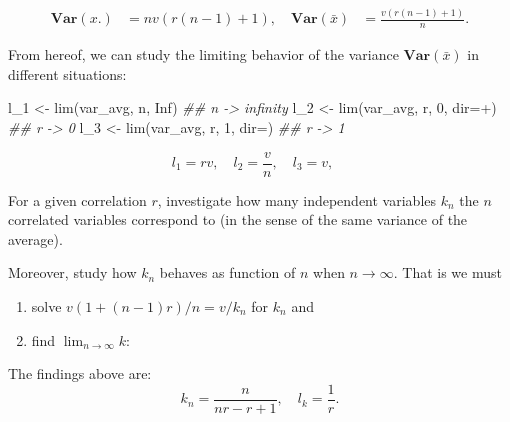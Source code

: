 \documentclass[
  ignorenonframetext,
]{beamer}
\newenvironment{Shaded}{\begin{snugshade}}{\end{snugshade}}
\newcommand{\AttributeTok}[1]{\textcolor[rgb]{0.40,0.45,0.13}{#1}}
\newcommand{\ConstantTok}[1]{\textcolor[rgb]{0.56,0.35,0.01}{#1}}
\newcommand{\DecValTok}[1]{\textcolor[rgb]{0.68,0.00,0.00}{#1}}
\newcommand{\DocumentationTok}[1]{\textcolor[rgb]{0.37,0.37,0.37}{\textit{#1}}}
\newcommand{\FunctionTok}[1]{\textcolor[rgb]{0.28,0.35,0.67}{#1}}
\newcommand{\NormalTok}[1]{\textcolor[rgb]{0.00,0.23,0.31}{#1}}
\newcommand{\OtherTok}[1]{\textcolor[rgb]{0.00,0.23,0.31}{#1}}
\newcommand{\SpecialCharTok}[1]{\textcolor[rgb]{0.37,0.37,0.37}{#1}}
\newcommand{\StringTok}[1]{\textcolor[rgb]{0.13,0.47,0.30}{#1}}
\begin{document}
\begin{frame}[fragile]
\begin{align*}
\mathbf{Var}(x.) &= n v \left(r \left(n - 1\right) + 1\right),
\quad
\mathbf{Var}(\bar x) &= \frac{v \left(r \left(n - 1\right) + 1\right)}{n}.
\end{align*}

From hereof, we can study the limiting behavior of the variance
\(\mathbf{Var}(\bar x)\) in different situations:

\begin{Shaded}
\begin{Highlighting}[]
\NormalTok{l\_1 }\OtherTok{\textless{}{-}} \FunctionTok{lim}\NormalTok{(var\_avg, n, }\ConstantTok{Inf}\NormalTok{)        }\DocumentationTok{\#\# n {-}\textgreater{} infinity}
\NormalTok{l\_2 }\OtherTok{\textless{}{-}} \FunctionTok{lim}\NormalTok{(var\_avg, r, }\DecValTok{0}\NormalTok{, }\AttributeTok{dir=}\StringTok{\textquotesingle{}+\textquotesingle{}}\NormalTok{) }\DocumentationTok{\#\# r {-}\textgreater{} 0}
\NormalTok{l\_3 }\OtherTok{\textless{}{-}} \FunctionTok{lim}\NormalTok{(var\_avg, r, }\DecValTok{1}\NormalTok{, }\AttributeTok{dir=}\StringTok{\textquotesingle{}{-}\textquotesingle{}}\NormalTok{) }\DocumentationTok{\#\# r {-}\textgreater{} 1}
\end{Highlighting}
\end{Shaded}

\[
l_1 = r v, \quad
l_2 = \frac{v}{n}, \quad
l_3 = v, \quad
\]
\end{frame}

\begin{frame}[fragile]
For a given correlation \(r\), investigate how many independent
variables \(k_n\) the \(n\) correlated variables correspond to (in the
sense of the same variance of the average).

Moreover, study how \(k_n\) behaves as function of \(n\) when
\(n \rightarrow \infty\). That is we must

\begin{enumerate}
\item
  solve \(v (1 + (n-1)r)/n = v/k_n\) for \(k_n\) and
\item
  find \(\lim_{n\rightarrow\infty} k\):
\end{enumerate}

\begin{Shaded}
\end{Shaded}

The findings above are: \[
k_n = \frac{n}{n r - r + 1}, \quad
l_k = \frac{1}{r} .
\]
\end{frame}
\end{document}
